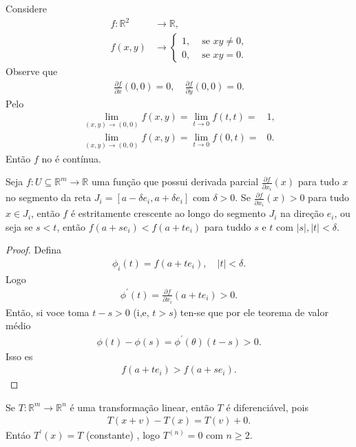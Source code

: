 \begin{example}
  Considere
  \begin{align*}
    f:\mathbb{R}^{2}&\to\mathbb{R},\\
    f(x,y)&\to\begin{cases}
      1, &\text{ se } xy\neq 0 \text{,} \\
      0, &\text{ se } xy=0 .
    \end{cases}
  \end{align*}
  Observe que
  \begin{align*}
    \frac{\partial f}{\partial x}(0,0)=0,\quad\frac{\partial f}{\partial y}(0,0)=0.
  \end{align*}
  Pelo
  \begin{align*}
    \lim_{(x,y) \to (0,0)}f(x,y)=\lim_{t \to 0}f(t,t)=&1,\\
    \lim_{(x,y) \to (0,0)}f(x,y)=\lim_{t \to 0}f(0,t)=&0.
  \end{align*}
  Então $f$ no é contínua. 
\end{example}
\begin{proposition}
  Seja $f:U\subseteq\mathbb{R}^{m}\to\mathbb{R}$ uma função que possui derivada parcial $\frac{\partial f}{\partial x_i}(x)$ para tudo $x$ no segmento da reta $J_i=[a-\delta e_i,a+\delta e_i]$ com $\delta>0$. Se $\frac{\partial f}{\partial x_i}(x)>0$ para tudo $x\in J_i$, então $f$ é estritamente crescente ao longo do segmento $J_i$ na direção $e_i$, ou seja se $s<t$, então $f(a+se_i)<f(a+te_i)$ para tuddo $s$ e $t$ com $|s|,|t|<\delta$. 
\end{proposition}
\begin{proof} 
  Defina
  \begin{align*}
    \phi_i(t)=f(a+te_i),\quad |t|<\delta.
  \end{align*}
  Logo
  \begin{align*}
    \phi^{\prime}(t)=\frac{\partial f}{\partial x_i}(a+te_i)>0.
  \end{align*}
  Então, si voce toma $t-s>0$ (i,e, $t>s$) ten-se que por ele teorema de valor médio
  \begin{align*}
    \phi(t)-\phi(s)=\phi^{\prime}(\theta)(t-s)>0.
  \end{align*}
  Isso es
  \begin{align*}
    f(a+te_i)>f(a+se_i).
  \end{align*}
\end{proof}
\begin{example}
  Se $T:\mathbb{R}^{m}\to\mathbb{R}^{n}$ é  uma transformação linear, então $T$ é diferenciável, pois
  \begin{align*}
    T(x+v)-T(x)=T(v)+0.
  \end{align*}
  Entáo $T^{\prime}(x)=T$ (constante) , logo $T^{(n)}=0$ com $n\geq 2$. 
\end{example}
